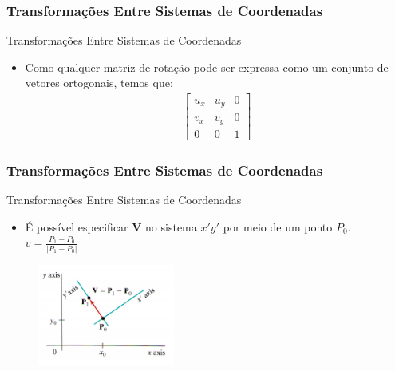 \documentclass{beamer}
\begin{document}
\begin{frame}
\frametitle{Transformações Entre Sistemas de Coordenadas}

	\begin{block}{Transformações Entre Sistemas de Coordenadas}
		\begin{itemize}
			\item Como qualquer matriz de rotação pode ser expressa como um conjunto de vetores ortogonais, temos que:
			\begin{eqnarray*}			
				\begin{bmatrix}
						u_x	& u_y	& 0 \\
						v_x 	& v_y	& 0 \\
						0	& 0	& 1
				\end{bmatrix}
			\end{eqnarray*}
		\end{itemize}
	\end{block}

\end{frame}


\begin{frame}
\frametitle{Transformações Entre Sistemas de Coordenadas}

	\begin{block}{Transformações Entre Sistemas de Coordenadas}
		\begin{itemize}
			\item É possível especificar \textbf{V} no sistema $x'y'$ por meio de um ponto $P_0$.\\
			$v=\frac{P_1 - P_0}{|P_1 - P_0|}$
		\end{itemize}
	\end{block}
	
	
	\begin{figure}[!h]
		\begin{center}
			\includegraphics[width=0.4\textwidth]{Figures/P0V}
		\end{center}
	\end{figure}

\end{frame}

\end{document}
